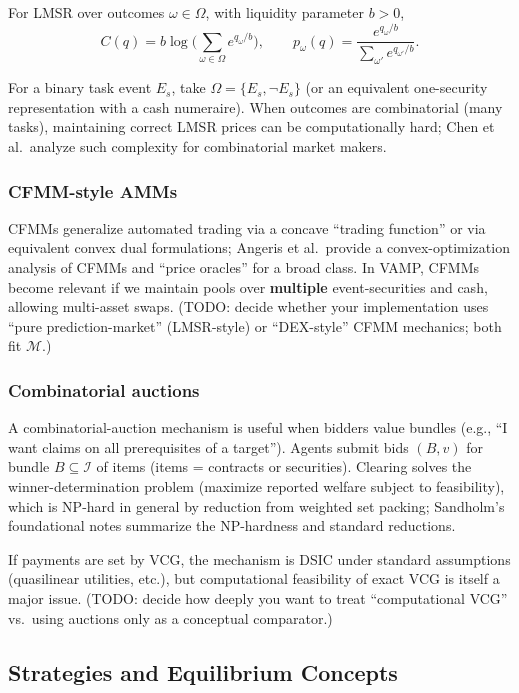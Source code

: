 For LMSR over outcomes \(\omega\in\Omega\), with liquidity parameter \(b>0\),
\[
C(q)=b\log\Big(\sum_{\omega\in\Omega} e^{q_\omega/b}\Big),
\qquad
p_\omega(q)=\frac{e^{q_\omega/b}}{\sum_{\omega'} e^{q_{\omega'}/b}}.
\]

For a binary task event \(E_s\), take \(\Omega=\{E_s,\neg E_s\}\) (or an equivalent one-security representation with a cash numeraire). When outcomes are combinatorial (many tasks), maintaining correct LMSR prices can be computationally hard; Chen et al.\ analyze such complexity for combinatorial market makers.

\subsubsection{CFMM-style AMMs}

CFMMs generalize automated trading via a concave ``trading function'' or via equivalent convex dual formulations; Angeris et al.\ provide a convex-optimization analysis of CFMMs and ``price oracles'' for a broad class. In VAMP, CFMMs become relevant if we maintain pools over \textbf{multiple} event-securities and cash, allowing multi-asset swaps. (TODO: decide whether your implementation uses ``pure prediction-market'' (LMSR-style) or ``DEX-style'' CFMM mechanics; both fit \(\mathcal{M}\).)

\subsubsection{Combinatorial auctions}

A combinatorial-auction mechanism is useful when bidders value bundles (e.g., ``I want claims on all prerequisites of a target''). Agents submit bids \((B,v)\) for bundle \(B\subseteq \mathcal{I}\) of items (items = contracts or securities). Clearing solves the winner-determination problem (maximize reported welfare subject to feasibility), which is NP-hard in general by reduction from weighted set packing; Sandholm's foundational notes summarize the NP-hardness and standard reductions.

If payments are set by VCG, the mechanism is DSIC under standard assumptions (quasilinear utilities, etc.), but computational feasibility of exact VCG is itself a major issue. (TODO: decide how deeply you want to treat ``computational VCG'' vs.\ using auctions only as a conceptual comparator.)

\subsection{Strategies and Equilibrium Concepts}

